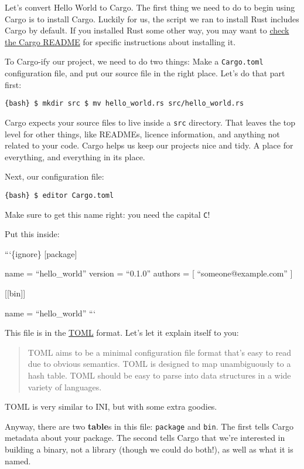 \documentclass[]{article}
\begin{document}
Let's convert Hello World to Cargo. The first thing we need to do to
begin using Cargo is to install Cargo. Luckily for us, the script we ran
to install Rust includes Cargo by default. If you installed Rust some
other way, you may want to
\href{https://github.com/rust-lang/cargo\#installing-cargo-from-nightlies}{check
the Cargo README} for specific instructions about installing it.

To Cargo-ify our project, we need to do two things: Make a
\texttt{Cargo.toml} configuration file, and put our source file in the
right place. Let's do that part first:

\texttt{\{bash\} \$ mkdir src \$ mv hello\_world.rs src/hello\_world.rs}

Cargo expects your source files to live inside a \texttt{src} directory.
That leaves the top level for other things, like READMEs, licence
information, and anything not related to your code. Cargo helps us keep
our projects nice and tidy. A place for everything, and everything in
its place.

Next, our configuration file:

\texttt{\{bash\} \$ editor Cargo.toml}

Make sure to get this name right: you need the capital \texttt{C}!

Put this inside:

```\{ignore\} {[}package{]}

name = ``hello\_world'' version = ``0.1.0'' authors = {[}
``someone@example.com'' {]}

{[}{[}bin{]}{]}

name = ``hello\_world'' ```

This file is in the \href{https://github.com/toml-lang/toml}{TOML}
format. Let's let it explain itself to you:

\begin{quote}
TOML aims to be a minimal configuration file format that's easy to read
due to obvious semantics. TOML is designed to map unambiguously to a
hash table. TOML should be easy to parse into data structures in a wide
variety of languages.
\end{quote}

TOML is very similar to INI, but with some extra goodies.

Anyway, there are two \textbf{table}s in this file: \texttt{package} and
\texttt{bin}. The first tells Cargo metadata about your package. The
second tells Cargo that we're interested in building a binary, not a
library (though we could do both!), as well as what it is named.
\end{document}
